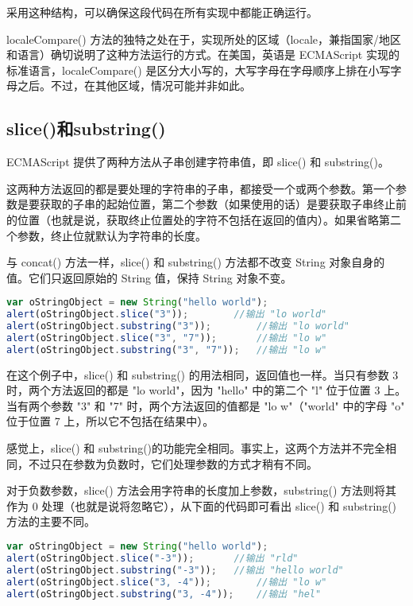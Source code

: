 采用这种结构，可以确保这段代码在所有实现中都能正确运行。

localeCompare() 方法的独特之处在于，实现所处的区域（locale，兼指国家/地区和语言）确切说明了这种方法运行的方式。在美国，英语是 ECMAScript 实现的标准语言，localeCompare() 是区分大小写的，大写字母在字母顺序上排在小写字母之后。不过，在其他区域，情况可能并非如此。


\subsection{slice()和substring()}


ECMAScript 提供了两种方法从子串创建字符串值，即 slice() 和 substring()。

这两种方法返回的都是要处理的字符串的子串，都接受一个或两个参数。第一个参数是要获取的子串的起始位置，第二个参数（如果使用的话）是要获取子串终止前的位置（也就是说，获取终止位置处的字符不包括在返回的值内）。如果省略第二个参数，终止位就默认为字符串的长度。

与 concat() 方法一样，slice() 和 substring() 方法都不改变 String 对象自身的值。它们只返回原始的 String 值，保持 String 对象不变。


\begin{lstlisting}[language=JavaScript]
var oStringObject = new String("hello world");
alert(oStringObject.slice("3"));		//输出 "lo world"
alert(oStringObject.substring("3"));		//输出 "lo world"
alert(oStringObject.slice("3", "7"));		//输出 "lo w"
alert(oStringObject.substring("3", "7"));	//输出 "lo w"
\end{lstlisting}


在这个例子中，slice() 和 substring() 的用法相同，返回值也一样。当只有参数 3 时，两个方法返回的都是 "lo world"，因为 "hello" 中的第二个 "l" 位于位置 3 上。当有两个参数 "3" 和 "7" 时，两个方法返回的值都是 "lo w"（"world" 中的字母 "o" 位于位置 7 上，所以它不包括在结果中）。


感觉上，slice() 和 substring()的功能完全相同。事实上，这两个方法并不完全相同，不过只在参数为负数时，它们处理参数的方式才稍有不同。

对于负数参数，slice() 方法会用字符串的长度加上参数，substring() 方法则将其作为 0 处理（也就是说将忽略它），从下面的代码即可看出 slice() 和 substring() 方法的主要不同。

\begin{lstlisting}[language=JavaScript]
var oStringObject = new String("hello world");
alert(oStringObject.slice("-3"));		//输出 "rld"
alert(oStringObject.substring("-3"));	//输出 "hello world"
alert(oStringObject.slice("3, -4"));		//输出 "lo w"
alert(oStringObject.substring("3, -4"));	//输出 "hel"
\end{lstlisting}

